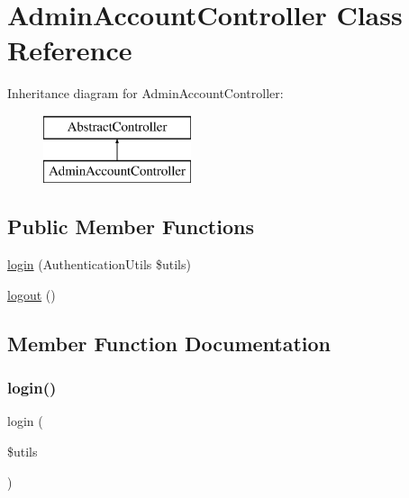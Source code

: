 \hypertarget{class_app_1_1_controller_1_1_admin_account_controller}{}\section{Admin\+Account\+Controller Class Reference}
\label{class_app_1_1_controller_1_1_admin_account_controller}
Inheritance diagram for Admin\+Account\+Controller\+:\begin{figure}[H]
\begin{center}
\leavevmode
\includegraphics[height=2.000000cm]{class_app_1_1_controller_1_1_admin_account_controller}
\end{center}
\end{figure}
\subsection*{Public Member Functions}
\begin{DoxyCompactItemize}
\item 
\mbox{\hyperlink{class_app_1_1_controller_1_1_admin_account_controller_a8450f41ecb91498fc9e3bce1d9d65ab9}{login}} (Authentication\+Utils \$utils)
\item 
\mbox{\hyperlink{class_app_1_1_controller_1_1_admin_account_controller_a082405d89acd6835c3a7c7a08a7adbab}{logout}} ()
\end{DoxyCompactItemize}


\subsection{Member Function Documentation}
\mbox{\label{class_app_1_1_controller_1_1_admin_account_controller_a8450f41ecb91498fc9e3bce1d9d65ab9}} 
\subsubsection{\texorpdfstring{login()}{login()}}
{\footnotesize\ttfamily login (\begin{DoxyParamCaption}\item[{Authentication\+Utils}]{\$utils }\end{DoxyParamCaption})}

